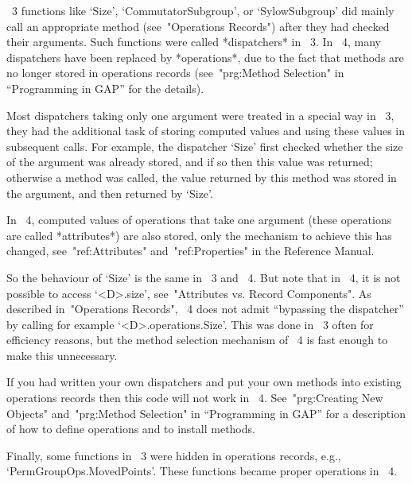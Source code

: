 
{\GAP}~3 functions like `Size', `CommutatorSubgroup', or
`SylowSubgroup' did mainly call an appropriate method (see~"Operations
Records") after they had checked their arguments.  Such functions were
called *dispatchers* in {\GAP}~3.  In {\GAP}~4, many dispatchers have
been replaced by *operations*, due to the fact that methods are no
longer stored in operations records (see~"prg:Method Selection" in
``Programming in GAP'' for the details).

Most dispatchers taking only one argument were treated in a special
way in {\GAP}~3, they had the additional task of storing computed
values and using these values in subsequent calls.  For example, the
dispatcher `Size' first checked whether the size of the argument was
already stored, and if so then this value was returned; otherwise a
method was called, the value returned by this method was stored in the
argument, and then returned by `Size'.

In {\GAP}~4, computed values of operations that take one argument
(these operations are called *attributes*) are also stored, only the
mechanism to achieve this has changed, see~"ref:Attributes"
and~"ref:Properties" in the Reference Manual.

So the behaviour of `Size' is the same in {\GAP}~3 and {\GAP}~4.  But
note that in {\GAP}~4, it is not possible to access `<D>.size',
see~"Attributes vs. Record Components".  As described in~"Operations
Records", {\GAP}~4 does not admit ``bypassing the dispatcher'' by
calling for example `<D>.operations.Size'.  This was done in {\GAP}~3
often for efficiency reasons, but the method selection mechanism of
{\GAP}~4 is fast enough to make this unnecessary.

If you had written your own dispatchers and put your own methods into
existing operations records then this code will not work in {\GAP}~4.
See~"prg:Creating New Objects" and~"prg:Method Selection" in
``Programming in GAP'' for a description of how to define operations
and to install methods.

Finally, some functions in {\GAP}~3 were hidden in
operations records, e.g., `PermGroupOps.MovedPoints'.
These functions became proper operations in {\GAP}~4.



